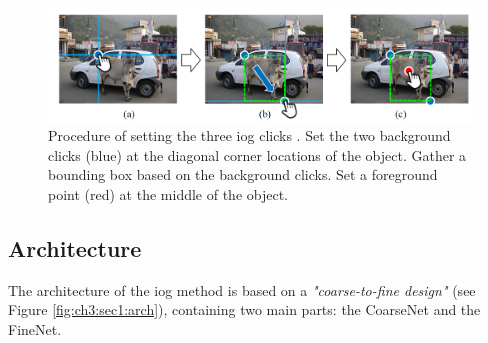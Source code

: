 \begin{figure}
	\includegraphics[width=\linewidth]{figures/chap31_clicks.png}
	\caption[IOG Application]{Procedure of setting the three \gls{iog} clicks \cite{Zha20-IOG}. Set the two background clicks (blue) at the diagonal corner locations of the object. Gather a bounding box based on the background clicks. Set a foreground point (red) at the middle of the object.}
	\label{fig:ch3:sec1:iog}
\end{figure}

\subsection{Architecture}\label{ord:ch3:sec4:subsec2}

The architecture of the \gls{iog} method is based on a \emph{"coarse-to-fine design"}\cite[p. 12237]{Zha20-IOG} (see Figure \ref{fig:ch3:sec1:arch}), containing two main parts: the CoarseNet and the FineNet.

